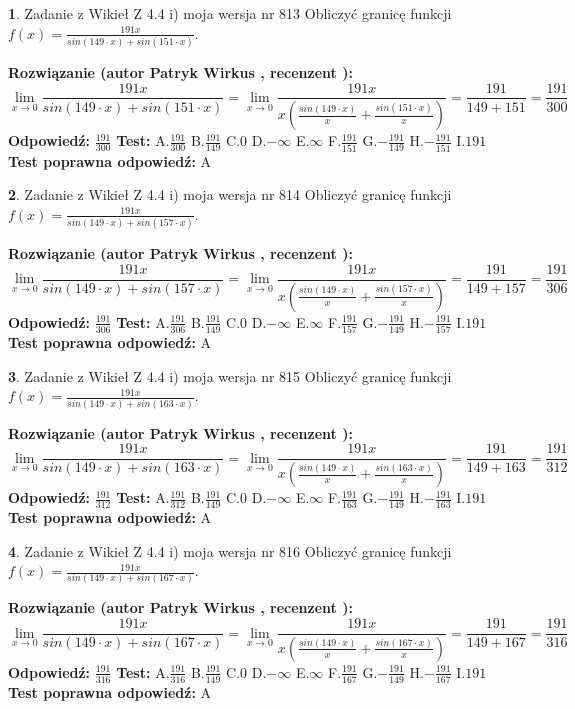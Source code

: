 \documentclass[12pt, a4paper]{article}
\theoremstyle{definition} %
\newtheorem{zad}{}
\newcommand{\zadStart}[1]{\begin{zad}#1\newline}
\newcommand{\zadStop}{\end{zad}}
\newcommand{\rozwStart}[2]{\noindent \textbf{Rozwiązanie (autor #1 , recenzent #2): }\newline}
\newcommand{\rozwStop}{\newline}
\newcommand{\odpStart}{\noindent \textbf{Odpowiedź:}\newline}
\newcommand{\odpStop}{\newline}
\newcommand{\testStart}{\noindent \textbf{Test:}\newline}
\newcommand{\testStop}{\newline}
\newcommand{\kluczStart}{\noindent \textbf{Test poprawna odpowiedź:}\newline}
\newcommand{\kluczStop}{\newline}
\begin{document}
\zadStart{Zadanie z Wikieł Z 4.4 i) moja wersja nr 813}
Obliczyć granicę funkcji $f(x)=\frac{191x}{sin(149\cdot x) +sin(151\cdot x)}$.
\zadStop
\rozwStart{Patryk Wirkus}{}
$$\lim\limits_{x\to 0}\frac{191x}{sin(149\cdot x) +sin(151\cdot x)}=\lim\limits_{x\to 0}\frac{191x}{x(\frac{sin(149\cdot x)}{x}+\frac{sin(151\cdot x)}{x})}=\frac{191}{149+151} = \frac{191}{300}$$
\rozwStop
\odpStart
$\frac{191}{300}$
\odpStop
\testStart
A.$\frac{191}{300}$
B.$\frac{191}{149}$
C.$0$
D.$-\infty$
E.$\infty$
F.$\frac{191}{151}$
G.$-\frac{191}{149}$
H.$-\frac{191}{151}$
I.$191$
\testStop
\kluczStart
A
\kluczStop



\zadStart{Zadanie z Wikieł Z 4.4 i) moja wersja nr 814}
Obliczyć granicę funkcji $f(x)=\frac{191x}{sin(149\cdot x) +sin(157\cdot x)}$.
\zadStop
\rozwStart{Patryk Wirkus}{}
$$\lim\limits_{x\to 0}\frac{191x}{sin(149\cdot x) +sin(157\cdot x)}=\lim\limits_{x\to 0}\frac{191x}{x(\frac{sin(149\cdot x)}{x}+\frac{sin(157\cdot x)}{x})}=\frac{191}{149+157} = \frac{191}{306}$$
\rozwStop
\odpStart
$\frac{191}{306}$
\odpStop
\testStart
A.$\frac{191}{306}$
B.$\frac{191}{149}$
C.$0$
D.$-\infty$
E.$\infty$
F.$\frac{191}{157}$
G.$-\frac{191}{149}$
H.$-\frac{191}{157}$
I.$191$
\testStop
\kluczStart
A
\kluczStop



\zadStart{Zadanie z Wikieł Z 4.4 i) moja wersja nr 815}
Obliczyć granicę funkcji $f(x)=\frac{191x}{sin(149\cdot x) +sin(163\cdot x)}$.
\zadStop
\rozwStart{Patryk Wirkus}{}
$$\lim\limits_{x\to 0}\frac{191x}{sin(149\cdot x) +sin(163\cdot x)}=\lim\limits_{x\to 0}\frac{191x}{x(\frac{sin(149\cdot x)}{x}+\frac{sin(163\cdot x)}{x})}=\frac{191}{149+163} = \frac{191}{312}$$
\rozwStop
\odpStart
$\frac{191}{312}$
\odpStop
\testStart
A.$\frac{191}{312}$
B.$\frac{191}{149}$
C.$0$
D.$-\infty$
E.$\infty$
F.$\frac{191}{163}$
G.$-\frac{191}{149}$
H.$-\frac{191}{163}$
I.$191$
\testStop
\kluczStart
A
\kluczStop



\zadStart{Zadanie z Wikieł Z 4.4 i) moja wersja nr 816}
Obliczyć granicę funkcji $f(x)=\frac{191x}{sin(149\cdot x) +sin(167\cdot x)}$.
\zadStop
\rozwStart{Patryk Wirkus}{}
$$\lim\limits_{x\to 0}\frac{191x}{sin(149\cdot x) +sin(167\cdot x)}=\lim\limits_{x\to 0}\frac{191x}{x(\frac{sin(149\cdot x)}{x}+\frac{sin(167\cdot x)}{x})}=\frac{191}{149+167} = \frac{191}{316}$$
\rozwStop
\odpStart
$\frac{191}{316}$
\odpStop
\testStart
A.$\frac{191}{316}$
B.$\frac{191}{149}$
C.$0$
D.$-\infty$
E.$\infty$
F.$\frac{191}{167}$
G.$-\frac{191}{149}$
H.$-\frac{191}{167}$
I.$191$
\testStop
\kluczStart
A
\kluczStop
\end{document}
